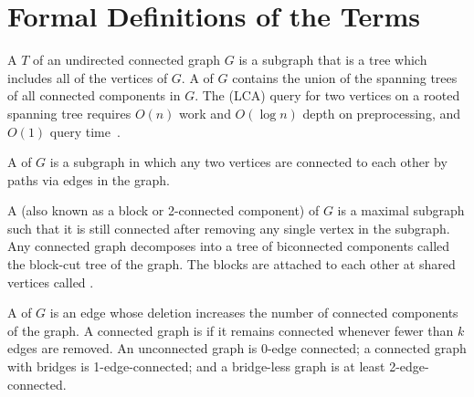 \section{Formal Definitions of the Terms}\label{sec:appendix-prelim}

A  $T$ of an undirected connected graph $G$ is a subgraph that is a tree which includes all of the vertices of $G$.
A  of $G$ contains the union of the spanning trees of all connected components in $G$.
The  (LCA) query for two vertices on a rooted spanning tree requires $O(n)$ work and $O(\log n)$ depth on preprocessing, and $O(1)$ query time~\cite{berkman1993recursive,sadakane2002space}.

A  of $G$ is a subgraph in which any two vertices are connected to each other by paths via edges in the graph.

A  (also known as a block or 2-connected component) of $G$ is a maximal subgraph such that it is still connected after removing any single vertex in the subgraph.
Any connected graph decomposes into a tree of biconnected components called the block-cut tree of the graph.
The blocks are attached to each other at shared vertices called .

A  of $G$ is an edge whose deletion increases the number of connected components of the graph.
A connected graph is  if it remains connected whenever fewer than $k$ edges are removed.
An unconnected graph is 0-edge connected; a connected graph with bridges is 1-edge-connected; and a bridge-less graph is at least 2-edge-connected.

